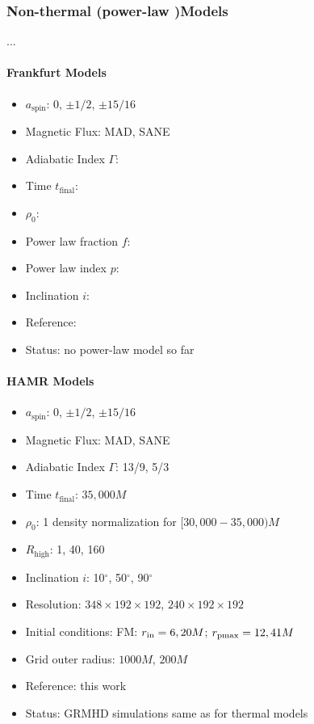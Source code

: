 \subsubsection{Non-thermal (power-law )Models}

...

\paragraph{Frankfurt Models}

\begin{itemize}[noitemsep]
\item $a_\mathrm{spin}$: 0, $\pm1/2$, $\pm15/16$
\item Magnetic Flux: MAD, SANE
\item Adiabatic Index $\Gamma$: 
\item Time $t_\mathrm{final}$: 
\item $\rho_0$: 
\item Power law fraction $f$:
\item Power law index $p$:
\item Inclination $i$:
\item Reference:
\item Status: no power-law model so far 
\end{itemize}

\paragraph{HAMR Models}

\begin{itemize}[noitemsep]
\item $a_\mathrm{spin}$: 0, $\pm1/2$, $\pm15/16$
\item Magnetic Flux: MAD, SANE
\item Adiabatic Index $\Gamma$: 13/9, 5/3
\item Time $t_\mathrm{final}$: $35,000M$
\item $\rho_0$: 1 density normalization for $[30,000-35,000)M$
\item $R_\mathrm{high}$: 1, 40, 160
\item Inclination $i$: 10$^\circ$, 50$^\circ$, 90$^\circ$
\item Resolution: $348\times 192\times 192$, $240\times 192\times 192$
\item Initial conditions: FM: $r_{\rm in}=6, 20M$; $r_{\rm pmax}=12, 41M$
\item Grid outer radius: $1000M$, $200M$
\item Reference: this work
\item Status: GRMHD simulations same as for thermal models
\end{itemize}

